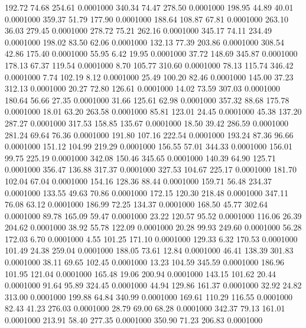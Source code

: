  192.72   74.68  254.61   0.0001000
 340.34   74.47  278.50   0.0001000
 198.95   44.89   40.01   0.0001000
 359.37   51.79  177.90   0.0001000
 188.64  108.87   67.81   0.0001000
 263.10   36.03  279.45   0.0001000
 278.72   75.21  262.16   0.0001000
 345.17   74.11  234.49   0.0001000
 198.02   83.50   62.06   0.0001000
 132.13   77.39  203.86   0.0001000
 308.54   42.86  175.40   0.0001000
  55.95    6.42   19.95   0.0001000
  37.72  148.69  345.87   0.0001000
 178.13   67.37  119.54   0.0001000
   8.70  105.77  310.60   0.0001000
  78.13  115.74  346.42   0.0001000
   7.74  102.19    8.12   0.0001000
  25.49  100.20   82.46   0.0001000
 145.00   37.23  312.13   0.0001000
  20.27   72.80  126.61   0.0001000
  14.02   73.59  307.03   0.0001000
 180.64   56.66   27.35   0.0001000
  31.66  125.61   62.98   0.0001000
 357.32   88.68  175.78   0.0001000
  18.01   63.20  263.58   0.0001000
  85.81  123.01   24.45   0.0001000
  45.38  137.20  287.27   0.0001000
 317.53  158.85  135.67   0.0001000
  18.50   39.42  286.59   0.0001000
 281.24   69.64   76.36   0.0001000
 191.80  107.16  222.54   0.0001000
 193.24   87.36   96.66   0.0001000
 151.12  104.99  219.29   0.0001000
 156.55   57.01  344.33   0.0001000
 156.01   99.75  225.19   0.0001000
 342.08  150.46  345.65   0.0001000
 140.39   64.90  125.71   0.0001000
 356.47  136.88  317.37   0.0001000
 327.53  104.67  225.17   0.0001000
 181.70  102.04   67.04   0.0001000
 154.16  128.36   88.44   0.0001000
 159.71   56.48  234.37   0.0001000
 133.55   49.63   70.86   0.0001000
 172.15  120.30  218.48   0.0001000
 347.11   76.08   63.12   0.0001000
 186.99   72.25  134.37   0.0001000
 168.50   45.77  302.64   0.0001000
  89.78  165.09   59.47   0.0001000
  23.22  120.57   95.52   0.0001000
 116.06   26.39  204.62   0.0001000
  38.92   55.78  122.09   0.0001000
  20.28   99.93  249.60   0.0001000
  56.28  172.03    6.70   0.0001000
   4.55  101.25  171.10   0.0001000
 129.33    6.32  170.53   0.0001000
 101.49   24.38  259.04   0.0001000
 188.05   73.61   12.84   0.0001000
  46.41  138.39  301.83   0.0001000
  38.11   69.65  102.45   0.0001000
  13.23  104.59  345.59   0.0001000
 186.96  101.95  121.04   0.0001000
 165.48   19.06  200.94   0.0001000
 143.15  101.62   20.44   0.0001000
  91.64   95.89  324.45   0.0001000
  44.94  129.86  161.37   0.0001000
  32.92   24.82  313.00   0.0001000
 199.88   64.84  340.99   0.0001000
 169.61  110.29  116.55   0.0001000
  82.43   41.23  276.03   0.0001000
  28.79   69.00   68.28   0.0001000
 342.37   79.13  161.01   0.0001000
 213.91   58.40  277.35   0.0001000
 350.90   71.23  206.83   0.0001000
